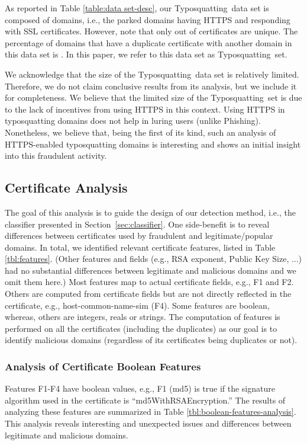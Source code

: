 \documentclass[twocolumn]{article}
\newcommand{\phishing}{\textsf{Phishing}}
\newcommand{\typosquatting}{\textsf{Typosquatting}}
\begin{document}
As reported in Table \ref{table:data set-desc}, our \typosquatting\ data set is composed of  domains, i.e., the parked domains 
having HTTPS and responding with SSL certificates.  However, note that only  out of  certificates are 
unique. The percentage of domains that have a duplicate certificate with another
domain in this data set is . In this paper, we refer to this data set as \typosquatting\ set.

We acknowledge that the size of the \typosquatting\ data set is relatively limited. Therefore, we do not claim conclusive results
from its analysis, but we include it for completeness. We believe that the limited size of the \typosquatting\ set is due to the 
lack of incentives from using HTTPS in this context. Using HTTPS in typosquatting domains does not help in luring users 
(unlike \phishing). Nonetheless, we believe that, being the first of its kind, such an analysis of HTTPS-enabled typosquatting 
domains is interesting and shows an initial insight into this fraudulent activity. 

\subsection{Certificate Analysis}\label{analysis-ssl}
The goal of this analysis is to guide the design of our detection method, i.e., the classifier presented in Section~\ref{sec:classifier}.
One side-benefit is to reveal differences
between certificates used by fraudulent and legitimate/popular domains.
In total, we identified  relevant certificate features, listed in Table
\ref{tbl:features}. (Other features and fields (e.g.,
RSA exponent, Public Key Size, ...) had no substantial differences
between legitimate and malicious domains and we omit them here.)
Most features map to actual certificate fields, e.g., F1 and F2. Others are
computed from certificate fields but are not
directly reflected in the certificate, e.g., host-common-name-sim (F4).
Some features are boolean, whereas,
others are integers, reals or strings. The computation of features is performed on 
all the certificates (including the duplicates) as our goal is to identify malicious domains (regardless of its certificates being duplicates or not).




\subsubsection{Analysis of Certificate Boolean Features}
Features F1-F4 have boolean values, e.g., F1 (md5) is true if the signature algorithm used 
in the certificate is ``md5WithRSAEncryption.'' The results of analyzing these features 
are summarized in Table \ref{tbl:boolean-features-analysis}. This analysis reveals
interesting and unexpected issues and differences between legitimate and malicious domains.
\end{document}
